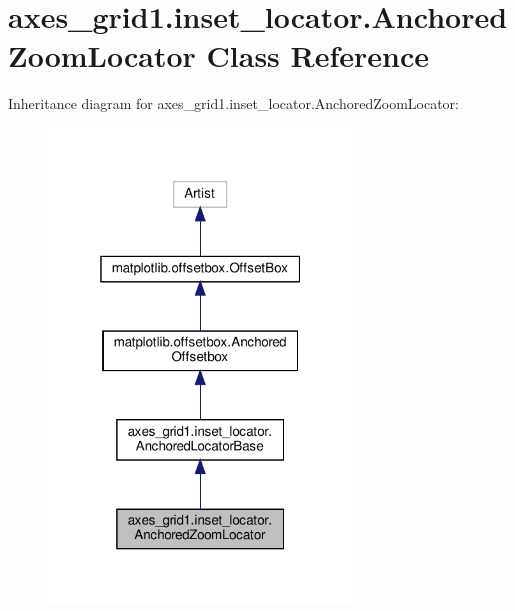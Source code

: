 \hypertarget{classaxes__grid1_1_1inset__locator_1_1AnchoredZoomLocator}{}\section{axes\+\_\+grid1.\+inset\+\_\+locator.\+Anchored\+Zoom\+Locator Class Reference}
\label{classaxes__grid1_1_1inset__locator_1_1AnchoredZoomLocator}


Inheritance diagram for axes\+\_\+grid1.\+inset\+\_\+locator.\+Anchored\+Zoom\+Locator\+:
\nopagebreak
\begin{figure}[H]
\begin{center}
\leavevmode
\includegraphics[width=229pt]{classaxes__grid1_1_1inset__locator_1_1AnchoredZoomLocator__inherit__graph}
\end{center}
\end{figure}


